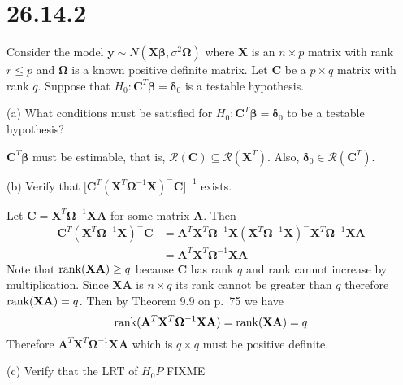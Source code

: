 \section*{26.14.2}
Consider the model $\mathbf y\sim N(\mathbf X\bm\beta,
\sigma^2\bm\Omega)$ where $\mathbf X$ is an $n\times p$ matrix
with rank $r\le p$ and $\bm\Omega$ is a known positive
definite matrix.
Let $\mathbf C$ be a $p\times q$ matrix with rank $q$.
Suppose that $H_0:\mathbf C^T\bm\beta=\bm\delta_0$ is a testable
hypothesis.

\bigskip
\noindent
(a) What conditions must be satisfied for
$H_0:\mathbf C^T\bm\beta=\bm\delta_0$
to be a testable hypothesis?

\bigskip
\noindent
$\mathbf C^T\bm\beta$ must be estimable, that is,
$\mathcal R(\mathbf C)\subseteq\mathcal R(\mathbf X^T)$.
Also, $\bm\delta_0\in\mathcal R(\mathbf C^T)$.

\bigskip
\noindent
(b) Verify that
$\bigg[\mathbf C^T(\mathbf X^T\bm\Omega^{-1}\mathbf X)^{-{}}
\mathbf C\bigg]^{-1}$ exists.

\bigskip
\noindent
Let $\mathbf C=\mathbf X^T\bm\Omega^{-1}\mathbf{XA}$
for some matrix $\mathbf A$.
Then
\begin{align*}
\mathbf C^T(\mathbf X^T\bm\Omega^{-1}\mathbf X)^{-{}}
\mathbf C
&=
\mathbf A^T\mathbf X^T\bm\Omega^{-1}
\mathbf X(\mathbf X^T\bm\Omega^{-1}
\mathbf X)^{-{}}\mathbf X^T\bm\Omega^{-1}\mathbf{XA}\\
&=
\mathbf A^T\mathbf X^T\bm\Omega^{-1}\mathbf X\mathbf A
\end{align*}
Note that $\mathop{\rm rank}(\mathbf{XA})\ge q$ because $\mathbf C$
has rank $q$ and rank cannot increase by multiplication.
Since $\mathbf{XA}$ is $n\times q$ its rank cannot be greater
than $q$ therefore $\mathop{\rm rank}(\mathbf{XA})=q$.
Then by Theorem 9.9 on p.\ 75 we have
\[
\mathop{\rm rank}(\mathbf A^T\mathbf X^T\bm\Omega^{-1}\mathbf X\mathbf A)
=\mathop{\rm rank}(\mathbf{XA})=q
\]
Therefore $\mathbf A^T\mathbf X^T\bm\Omega^{-1}\mathbf X\mathbf A$
which is $q\times q$ must be positive definite.

\bigskip
\noindent
(c) Verify that the LRT of $H_0P$ FIXME

